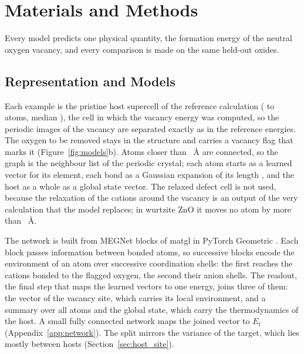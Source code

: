 \section{Materials and Methods}
\label{sec:methods}

Every model predicts one physical quantity, the formation energy of the neutral oxygen vacancy, and every comparison is made on the same held-out oxides.



\subsection{Representation and Models}
\label{sec:models}

Each example is the pristine host supercell of the reference calculation (\numGraphsVOneStatsAtomsMin{} to \numGraphsVOneStatsAtomsMax{} atoms, median \numGraphsVOneStatsAtomsMedian{}), the cell in which the vacancy energy was computed, so the periodic images of the vacancy are separated exactly as in the reference energies. The oxygen to be removed stays in the structure and carries a vacancy flag that marks it (Figure~\ref{fig:models}b). Atoms closer than \numCfgGraphCutoffA{}~\AA{} are connected, so the graph is the neighbour list of the periodic crystal; each atom starts as a learned vector for its element, each bond as a Gaussian expansion of its length \citep{Chen2019graph}, and the host as a whole as a global state vector. The relaxed defect cell is not used, because the relaxation of the cations around the vacancy is an output of the very calculation that the model replaces; in wurtzite ZnO it moves no atom by more than \numStructureAuditZnoPristineVsRelaxedDisplacementAMaxOfMatchedAtoms{}~\AA{}.

The network is built from MEGNet blocks \citep{Chen2019graph} of matgl \vermatgl{} \citep{Ko2025materials} in PyTorch Geometric \citep{Fey2019fast,Paszke2019pytorch}. Each block passes information between bonded atoms, so successive blocks encode the environment of an atom over successive coordination shells: the first reaches the cations bonded to the flagged oxygen, the second their anion shells. The readout, the final step that maps the learned vectors to one energy, joins three of them: the vector of the vacancy site, which carries its local environment, and a summary over all atoms and the global state, which carry the thermodynamics of the host. A small fully connected network maps the joined vector to $E_\mathrm{f}$ (Appendix~\ref{app:network}). The split mirrors the variance of the target, which lies mostly between hosts (Section~\ref{sec:host_site}).

